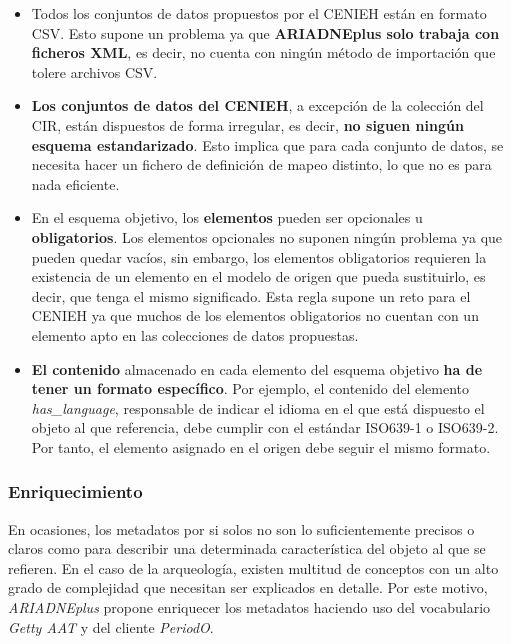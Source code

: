 \begin{itemize}
\tightlist
\item
  Todos los conjuntos de datos propuestos por el CENIEH están en formato
  CSV. Esto supone un problema ya que \textbf{ARIADNEplus solo trabaja
  con ficheros XML}, es decir, no cuenta con ningún método de
  importación que tolere archivos CSV.
\item
  \textbf{Los conjuntos de datos del CENIEH}, a excepción de la
  colección del CIR, están dispuestos de forma irregular, es decir,
  \textbf{no siguen ningún esquema estandarizado}. Esto implica que para
  cada conjunto de datos, se necesita hacer un fichero de definición de
  mapeo distinto, lo que no es para nada eficiente.
\item
  En el esquema objetivo, los \textbf{elementos} pueden ser opcionales u
  \textbf{obligatorios}. Los elementos opcionales no suponen ningún
  problema ya que pueden quedar vacíos, sin embargo, los elementos
  obligatorios requieren la existencia de un elemento en el modelo de
  origen que pueda sustituirlo, es decir, que tenga el mismo
  significado. Esta regla supone un reto para el CENIEH ya que muchos de
  los elementos obligatorios no cuentan con un elemento apto en las
  colecciones de datos propuestas.
\item
  \textbf{El contenido} almacenado en cada elemento del esquema objetivo
  \textbf{ha de tener un formato específico}. Por ejemplo, el contenido
  del elemento \emph{has\_language}, responsable de indicar el idioma en
  el que está dispuesto el objeto al que referencia, debe cumplir con el
  estándar ISO639-1 o ISO639-2. Por tanto, el elemento asignado en el
  origen debe seguir el mismo formato.
\end{itemize}


\subsubsection{Enriquecimiento}

En ocasiones, los metadatos por si solos no son lo suficientemente
precisos o claros como para describir una determinada característica del
objeto al que se refieren. En el caso de la arqueología, existen
multitud de conceptos con un alto grado de complejidad que necesitan ser
explicados en detalle. Por este motivo, \emph{ARIADNEplus} propone enriquecer
los metadatos haciendo uso del vocabulario \emph{Getty AAT} y del
cliente \emph{PeriodO}.



